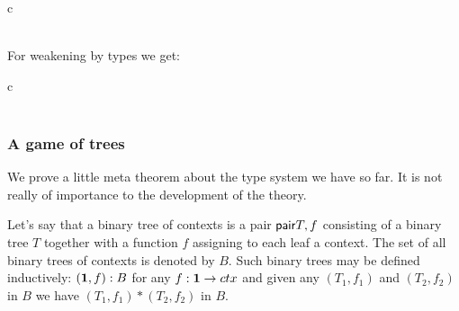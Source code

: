\begin{infarray}{c}
          {
            {}}\\
          {
            {}
            {}}\\
          {
            {}{}{}}
\end{infarray}

For weakening by types we get:

\begin{infarray}{c}
          {
            {}}\\
          {
            {}
            {}}\\
          {
            {}{}{}}
\end{infarray}

\subsubsection{A game of trees}
We prove a little meta theorem about the type system we have so far. It is not
really of importance to the development of the theory. 

Let's say
that a binary tree of contexts is a pair $\mathsf{pair}{T,f}$ consisting of a binary 
tree $T$ together with a function $f$ assigning to each leaf a context. The set
of all binary trees of contexts is denoted by $B$. Such
binary trees may be defined inductively: $(\mathbf{1},f):B$ for any $f:\mathbf{1}\to ctx$
and given any $(T_1,f_1)$ and $(T_2,f_2)$ in $B$ we have $(T_1,f_1)*(T_2,f_2)$
in $B$.

